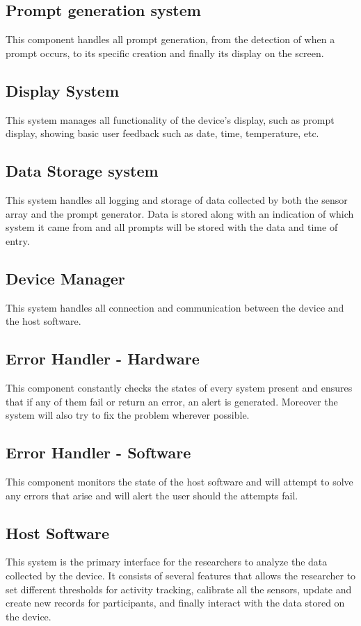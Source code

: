 \documentclass{article}
\begin{document}
\subsection{\label{Prompt_sec}Prompt generation system}
This component handles  all prompt generation, from the detection of when a prompt occurs, to its specific creation and finally its display on the screen.

\subsection{\label{Display_sec}Display System}
This system manages all functionality of the device's display, such as prompt display, showing basic user feedback such as date, time, temperature, etc.

\subsection{\label{Storage_sec}Data Storage system}
This system handles all logging and storage of data collected by both the sensor array and the prompt generator. Data is stored along with an indication of which system it came from and all prompts will be 				stored with the data and time of entry.

\subsection{\label{DevMan_sec}Device Manager}
This system handles all connection and communication between the device and the host software.

\subsection{\label{ErrHand_sec}Error Handler - Hardware}
This component constantly checks the states of every system present and ensures that if any of them fail or return an error, an alert is generated. Moreover the system will also try to fix the problem 					wherever possible.

\subsection{Error Handler - Software}
This component monitors the state of the host software and will attempt to solve any errors that arise and will alert the user should the attempts fail.

\subsection{\label{HostSfwr_sec}Host Software}
This system is the primary interface for the researchers to analyze the data collected by the device. It consists of several features that allows the researcher to set different
thresholds for activity tracking, calibrate all the sensors, update and create new records for participants, and finally interact with the data stored on the device.
\end{document}
